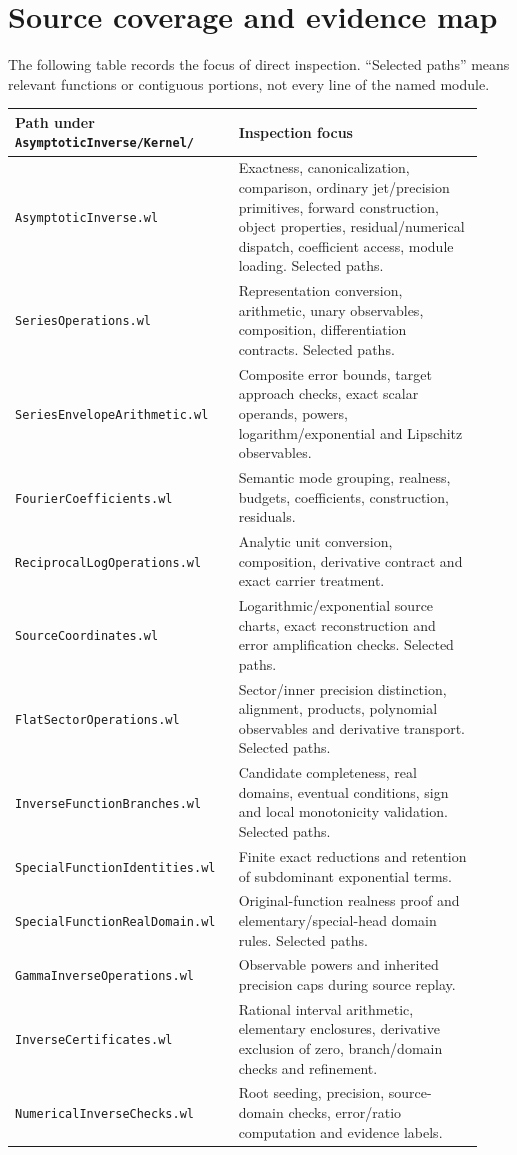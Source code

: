 \documentclass[11pt,letterpaper]{article}
\newcommand{\code}[1]{{\small\nolinkurl{#1}}}
\begin{document}
\section{Source coverage and evidence map}
\label{app:coverage}
The following table records the focus of direct inspection. ``Selected paths'' means relevant functions or contiguous portions, not every line of the named module.
\begin{longtable}{@{}p{0.43\linewidth}p{0.50\linewidth}@{}}
\toprule
Path under \code{AsymptoticInverse/Kernel/} & Inspection focus\\\midrule
\endhead
\code{AsymptoticInverse.wl} & Exactness, canonicalization, comparison, ordinary jet/precision primitives, forward construction, object properties, residual/numerical dispatch, coefficient access, module loading. Selected paths.\\[4pt]
\code{SeriesOperations.wl} & Representation conversion, arithmetic, unary observables, composition, differentiation contracts. Selected paths.\\[4pt]
\code{SeriesEnvelopeArithmetic.wl} & Composite error bounds, target approach checks, exact scalar operands, powers, logarithm/exponential and Lipschitz observables.\\[4pt]
\code{FourierCoefficients.wl} & Semantic mode grouping, realness, budgets, coefficients, construction, residuals.\\[4pt]
\code{ReciprocalLogOperations.wl} & Analytic unit conversion, composition, derivative contract and exact carrier treatment.\\[4pt]
\code{SourceCoordinates.wl} & Logarithmic/exponential source charts, exact reconstruction and error amplification checks. Selected paths.\\[4pt]
\code{FlatSectorOperations.wl} & Sector/inner precision distinction, alignment, products, polynomial observables and derivative transport. Selected paths.\\[4pt]
\code{InverseFunctionBranches.wl} & Candidate completeness, real domains, eventual conditions, sign and local monotonicity validation. Selected paths.\\[4pt]
\code{SpecialFunctionIdentities.wl} & Finite exact reductions and retention of subdominant exponential terms.\\[4pt]
\code{SpecialFunctionRealDomain.wl} & Original-function realness proof and elementary/special-head domain rules. Selected paths.\\[4pt]
\code{GammaInverseOperations.wl} & Observable powers and inherited precision caps during source replay.\\[4pt]
\code{InverseCertificates.wl} & Rational interval arithmetic, elementary enclosures, derivative exclusion of zero, branch/domain checks and refinement.\\[4pt]
\code{NumericalInverseChecks.wl} & Root seeding, precision, source-domain checks, error/ratio computation and evidence labels.\\\bottomrule
\end{longtable}
\end{document}

